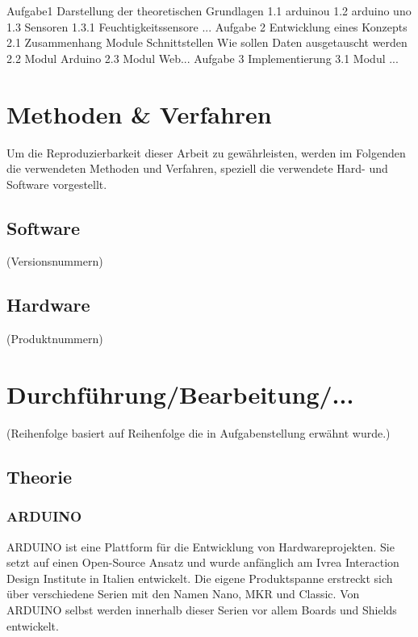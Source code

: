 \documentclass[
    load-dhbw-templates,
    load-preamble = true,
    auto-intro-pages = all,
    add-tocs-to-toc,
    debug = true,
    language = english,
    mainlanguage = ngerman,
    add-bibliography,
    bib-file = dhbw-source.bib,
    biblatex/style = alphabetic, 
]{iodhbwm}
\begin{document}
    Aufgabe1 
    Darstellung der theoretischen Grundlagen
    1.1 arduinou
    1.2 arduino uno
    1.3 Sensoren
    1.3.1 Feuchtigkeitssensore
    ...
    Aufgabe 2
    Entwicklung eines Konzepts
    2.1 Zusammenhang Module
    Schnittstellen
    Wie sollen Daten ausgetauscht werden
    2.2 Modul Arduino
    2.3 Modul Web...
    Aufgabe 3
    Implementierung
    3.1 Modul ... 
    





\chapter{Methoden \& Verfahren}
    Um die Reproduzierbarkeit dieser Arbeit zu gewährleisten, werden im Folgenden die verwendeten Methoden und Verfahren, speziell die verwendete Hard- und Software vorgestellt.
    
    \section{Software}
        (Versionsnummern)
    \section{Hardware}
        (Produktnummern)
    


\chapter{Durchführung/Bearbeitung/...}

(Reihenfolge basiert auf Reihenfolge die in Aufgabenstellung erwähnt wurde.)

    \section{Theorie}
        \subsection{ARDUINO}

        ARDUINO ist eine Plattform für die Entwicklung von Hardwareprojekten.
        Sie setzt auf einen Open-Source Ansatz und wurde anfänglich am Ivrea Interaction Design Institute in Italien entwickelt.
        Die eigene Produktspanne erstreckt sich über verschiedene Serien mit den Namen Nano, MKR und Classic.
        Von ARDUINO selbst werden innerhalb dieser Serien vor allem Boards und Shields entwickelt. 
        
\end{document}
